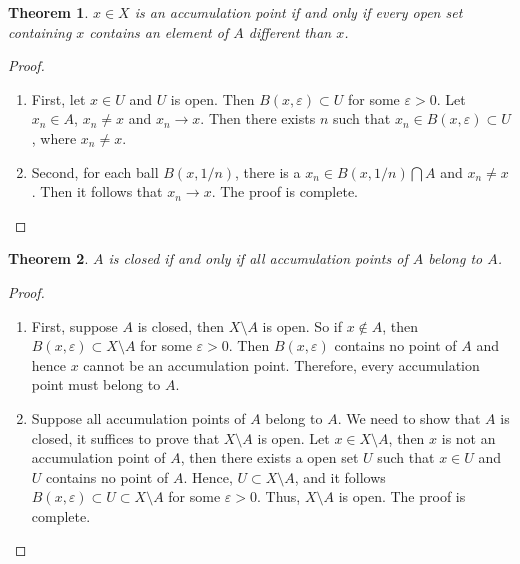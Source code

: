 \documentclass[12pt,leqno]{amsart}
\newtheorem{theorem}{Theorem}[section]
\theoremstyle{definition}
\numberwithin{equation}{subsection}
\begin{document}
\begin{theorem}
$x\in X$ is an accumulation point if and only if every open set containing $x$ contains an element of $A$ different than $x$.
\end{theorem}
\begin{proof}
~\begin{enumerate}
    \item First, let $x \in U$ and $U$ is open. Then $B(x,\varepsilon)\subset U$ for some $\varepsilon > 0$. Let $x_n\in A$, $x_n \neq x$ and $x_n\to x$. Then there exists $n$ such that $x_n\in B(x,\varepsilon)\subset U$, where $x_n \neq x$.
    \item Second, for each ball $B(x, 1/n)$, there is a $x_n\in B(x,1/n)\bigcap A$ and $x_n \neq x$. Then it follows that $x_n\to x$. The proof is complete.
\end{enumerate}
\end{proof}

\medskip

\begin{theorem}
$A$ is closed if and only if all accumulation points of $A$ belong to $A$.
\end{theorem}
\begin{proof}
~\begin{enumerate}
    \item First, suppose $A$ is closed, then $X\setminus A$ is open. So if $x\notin A$, then $B(x,\varepsilon)\subset X\setminus A$ for some $\varepsilon>0$. Then $B(x,\varepsilon)$ contains no point of $A$ and hence $x$ cannot be an accumulation point. Therefore, every accumulation point must belong to $A$.
    \item Suppose all accumulation points of $A$ belong to $A$. We need to show that $A$ is closed, it suffices to prove that $X\setminus A$ is open. Let $x\in X\setminus A$, then $x$ is not an accumulation point of $A$, then there exists a open set $U$ such that $x\in U$ and $U$ contains no point of $A$. Hence, $U\subset X\setminus A$, and it follows $B(x,\varepsilon)\subset U\subset X\setminus A$ for some $\varepsilon > 0$. Thus, $X\setminus A$ is open. The proof is complete.
\end{enumerate}
\end{proof}

\medskip
\end{document}
